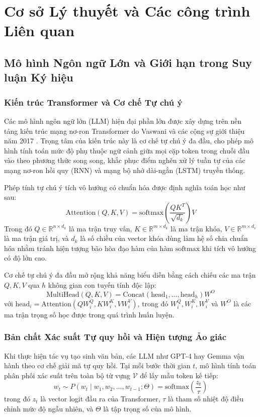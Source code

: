 \chapter{Cơ sở Lý thuyết và Các công trình Liên quan}
\label{ch:theory}

\section{Mô hình Ngôn ngữ Lớn và Giới hạn trong Suy luận Ký hiệu}
\label{sec:theory_llm}

\subsection{Kiến trúc Transformer và Cơ chế Tự chú ý}
Các mô hình ngôn ngữ lớn (LLM) hiện đại phần lớn được xây dựng trên nền tảng kiến trúc mạng nơ-ron Transformer do Vaswani và các cộng sự giới thiệu năm 2017 \cite{vaswani2017attention}. Trọng tâm của kiến trúc này là cơ chế tự chú ý đa đầu, cho phép mô hình tính toán mức độ phụ thuộc ngữ cảnh giữa mọi cặp token trong chuỗi đầu vào theo phương thức song song, khắc phục điểm nghẽn xử lý tuần tự của các mạng nơ-ron hồi quy (RNN) và mạng bộ nhớ dài-ngắn (LSTM) truyền thống.

Phép tính tự chú ý tích vô hướng có chuẩn hóa được định nghĩa toán học như sau:
\begin{equation}
    \text{Attention}(Q, K, V) = \text{softmax}\left(\frac{Q K^T}{\sqrt{d_k}}\right) V
\end{equation}
Trong đó $Q \in \mathbb{R}^{n \times d_k}$ là ma trận truy vấn, $K \in \mathbb{R}^{m \times d_k}$ là ma trận khóa, $V \in \mathbb{R}^{m \times d_v}$ là ma trận giá trị, và $d_k$ là số chiều của vector khóa dùng làm hệ số chia chuẩn hóa nhằm tránh hiện tượng bão hòa đạo hàm của hàm $\text{softmax}$ khi tích vô hướng có độ lớn cao.

Cơ chế tự chú ý đa đầu mở rộng khả năng biểu diễn bằng cách chiếu các ma trận $Q, K, V$ qua $h$ không gian con tuyến tính độc lập:
\begin{equation}
    \text{MultiHead}(Q, K, V) = \text{Concat}(\text{head}_1, \dots, \text{head}_h) W^O
\end{equation}
với $\text{head}_i = \text{Attention}(Q W_i^Q, K W_i^K, V W_i^V)$, trong đó $W_i^Q, W_i^K, W_i^V$ và $W^O$ là các ma trận trọng số học được trong quá trình huấn luyện.

\subsection{Bản chất Xác suất Tự quy hồi và Hiện tượng Ảo giác}
Khi thực hiện tác vụ tạo sinh văn bản, các LLM như GPT-4 hay Gemma vận hành theo cơ chế giải mã tự quy hồi. Tại mỗi bước thời gian $t$, mô hình tính toán phân phối xác suất trên toàn bộ từ vựng $\mathcal{V}$ để lấy mẫu token kế tiếp:
\begin{equation}
    w_t \sim P(w_t \mid w_1, w_2, \dots, w_{t-1}; \Theta) = \text{softmax}\left( \frac{z_t}{\tau} \right)
\end{equation}
trong đó $z_t$ là vector logit đầu ra của Transformer, $\tau$ là tham số nhiệt độ điều chỉnh mức độ ngẫu nhiên, và $\Theta$ là tập trọng số của mô hình.


